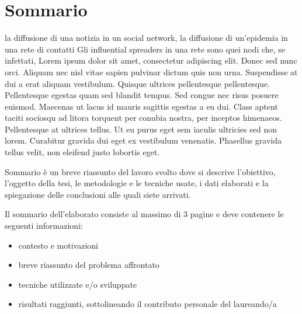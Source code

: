 \chapter*{Sommario} %
\label{sommario}


la diffusione di una notizia in un social network, la diffusione di un'epidemia
in una rete di contatti 
Gli influential spreaders in una rete sono quei nodi che, se infettati, 
Lorem ipsum dolor sit amet, consectetur adipiscing elit. Donec sed nunc 
orci. Aliquam nec nisl vitae sapien pulvinar dictum quis non urna. 
Suspendisse at dui a erat aliquam vestibulum. Quisque ultrices pellentesque pellentesque. 
Pellentesque egestas quam sed blandit tempus. Sed congue nec risus posuere
 euismod. Maecenas ut lacus id mauris sagittis egestas a eu dui. 
 Class aptent taciti sociosqu ad litora torquent per conubia nostra, 
 per inceptos himenaeos. Pellentesque at ultrices tellus. Ut eu purus 
 eget sem iaculis ultricies sed non lorem. Curabitur gravida dui eget ex 
 vestibulum venenatis. Phasellus gravida tellus velit, non eleifend justo 
 lobortis eget.


  Sommario è un breve riassunto del lavoro svolto dove si descrive l'obiettivo, l'oggetto della tesi, le 
metodologie e le tecniche usate, i dati elaborati e la spiegazione delle conclusioni alle quali siete arrivati.  

Il sommario dell’elaborato consiste al massimo di 3 pagine e deve contenere le seguenti informazioni:
\begin{itemize}
  \item contesto e motivazioni 
  \item breve riassunto del problema affrontato
  \item tecniche utilizzate e/o sviluppate
  \item risultati raggiunti, sottolineando il contributo personale del laureando/a
\end{itemize}



